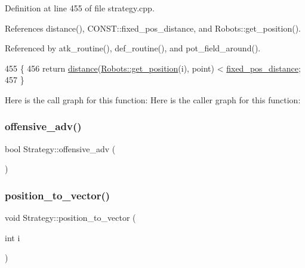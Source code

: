 Definition at line 455 of file strategy.\+cpp.



References distance(), C\+O\+N\+S\+T\+::fixed\+\_\+pos\+\_\+distance, and Robots\+::get\+\_\+position().



Referenced by atk\+\_\+routine(), def\+\_\+routine(), and pot\+\_\+field\+\_\+around().


\begin{DoxyCode}
455                                            \{
456     \textcolor{keywordflow}{return} \hyperlink{class_strategy_aacce05caed71553c4efd2d28c9c3aa39}{distance}(\hyperlink{class_robots_a1fca8f2f5070176faa6ba1efa2f1ff14}{Robots::get\_position}(i), point) < 
      \hyperlink{namespace_c_o_n_s_t_ae8d764cbcf03a0351752bff7d9cb30e6}{fixed\_pos\_distance};
457 \}
\end{DoxyCode}
Here is the call graph for this function\+:
Here is the caller graph for this function\+:
\mbox{\label{class_strategy_abb6bf2cb095ffd73ec9501f2abcd27c0}} 
\subsubsection{\texorpdfstring{offensive\+\_\+adv()}{offensive\_adv()}}
{\footnotesize\ttfamily bool Strategy\+::offensive\+\_\+adv (\begin{DoxyParamCaption}{ }\end{DoxyParamCaption})}

\mbox{\label{class_strategy_afa755796f0301750d616afac02ac935a}} 
\subsubsection{\texorpdfstring{position\+\_\+to\+\_\+vector()}{position\_to\_vector()}}
{\footnotesize\ttfamily void Strategy\+::position\+\_\+to\+\_\+vector (\begin{DoxyParamCaption}\item[{int}]{i }\end{DoxyParamCaption})}



